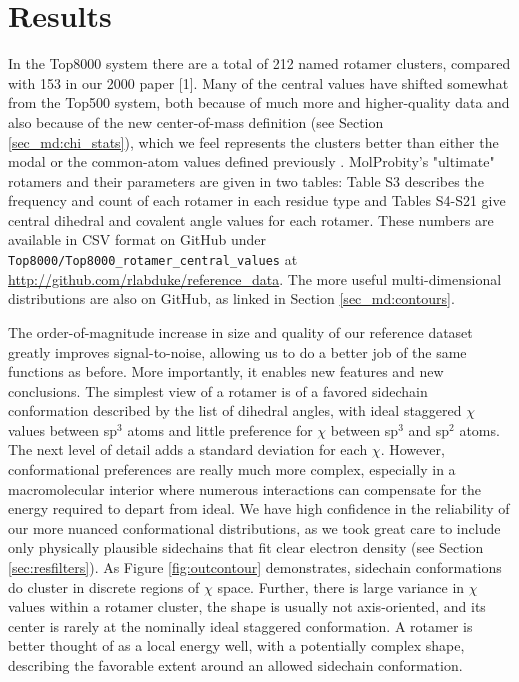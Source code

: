 \section{Results}
In the Top8000 system there are a total of \textcolor{changecolor}{212 named rotamer clusters, compared with 153 in our 2000 paper [1]}. Many of the central values have shifted somewhat from the Top500 system, both because of much more and higher-quality data and also because of the new center-of-mass definition (see Section \ref{sec_md:chi_stats}), which we feel represents the clusters better than either the modal or the common-atom values defined previously \cite{lovell2000penultimate}. MolProbity's "ultimate" rotamers and their parameters are given in two tables: Table S3 describes the frequency and count of each rotamer in each residue type and Tables S4-S21 give central dihedral and covalent angle values for each rotamer. These numbers are available in CSV format on GitHub under \texttt{Top8000/Top8000\_rotamer\_central\_values} at \url{http://github.com/rlabduke/reference_data}. The more useful multi-dimensional distributions are also on GitHub, as linked in Section \ref{sec_md:contours}.

The order-of-magnitude increase in size and quality of our reference dataset greatly improves signal-to-noise, allowing us to do a better job of the same functions as before. More importantly, it enables new features and new conclusions. The simplest view of a rotamer is of a favored sidechain conformation described by the list of dihedral angles, with ideal staggered $\chi$ values between sp$^{3}$ atoms and little preference for $\chi$ between sp$^{3}$ and sp$^{2}$ atoms. The next level of detail adds a standard deviation for each $\chi$. However, conformational preferences are really much more complex, especially in a macromolecular interior where numerous interactions can compensate for the energy required to depart from ideal. We have high confidence in the reliability of our more nuanced conformational distributions, as we took great care to include only physically plausible sidechains that fit clear electron density (see Section \ref{sec:resfilters}). As Figure \ref{fig:outcontour} demonstrates, sidechain conformations do cluster in discrete regions of $\chi$ space. Further, there is large variance in $\chi$ values within a rotamer cluster, the shape is usually not axis-oriented, and its center is rarely at the nominally ideal staggered conformation. A rotamer is better thought of as a local energy well, with a potentially complex shape, describing the favorable extent around an allowed sidechain conformation.

